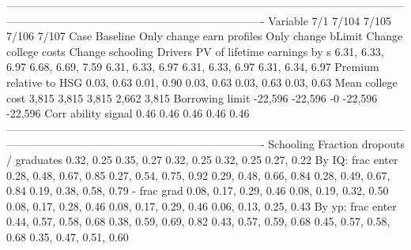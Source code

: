 ----------------------------------------------------------------------------------------------------------------------------------------------------------------------------------
                              Variable                         7/1                          7/104                    7/105                       7/106                       7/107
                                  Case                    Baseline      Only change earn profiles       Only change bLimit        Change college costs            Change schooling
                               Drivers                                                                                                                                            
          PV of lifetime earnings by s            6.31, 6.33, 6.97               6.68, 6.69, 7.59         6.31, 6.33, 6.97            6.31, 6.33, 6.97            6.31, 6.34, 6.97
               Premium relative to HSG                  0.03, 0.63                     0.01, 0.90               0.03, 0.63                  0.03, 0.63                  0.03, 0.63
                     Mean college cost                       3,815                          3,815                    3,815                       2,662                       3,815
                       Borrowing limit                     -22,596                        -22,596                       -0                     -22,596                     -22,596
                   Corr ability signal                        0.46                           0.46                     0.46                        0.46                        0.46
----------------------------------------------------------------------------------------------------------------------------------------------------------------------------------
                             Schooling                                                                                                                                            
         Fraction dropouts / graduates                  0.32, 0.25                     0.35, 0.27               0.32, 0.25                  0.32, 0.25                  0.27, 0.22
                     By IQ: frac enter      0.28, 0.48, 0.67, 0.85         0.27, 0.54, 0.75, 0.92   0.29, 0.48, 0.66, 0.84      0.28, 0.49, 0.67, 0.84      0.19, 0.38, 0.58, 0.79
                           - frac grad      0.08, 0.17, 0.29, 0.46         0.08, 0.19, 0.32, 0.50   0.08, 0.17, 0.28, 0.46      0.08, 0.17, 0.29, 0.46      0.06, 0.13, 0.25, 0.43
                     By yp: frac enter      0.44, 0.57, 0.58, 0.68         0.38, 0.59, 0.69, 0.82   0.43, 0.57, 0.59, 0.68      0.45, 0.57, 0.58, 0.68      0.35, 0.47, 0.51, 0.60

